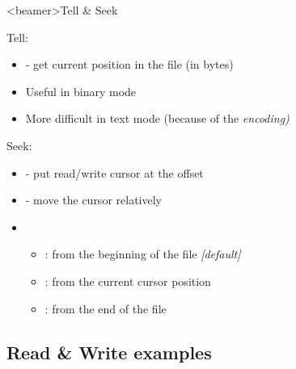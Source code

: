 
\begin{frame}<beamer>{Tell \& Seek}

  Tell:

  \begin{itemize}
    \item<1->  - get current position in the file (in bytes)
    \item<2-> Useful in binary mode
    \item<3-> More difficult in text mode (because of the \textit{encoding)}
  \end{itemize}

  \bigskip

   Seek:

  \begin{itemize}
    \item<5->  - put read/write cursor at the offset
    \item<5->  - move the cursor relatively
    \item<6-> 
      \begin{itemize}
       \item {} : from the beginning of the file \textit{[default]}
       \item {} : from the current cursor position
       \item {} : from the end of the file
      \end{itemize}
  \end{itemize}

\end{frame}


\subsection{Read \& Write examples}


